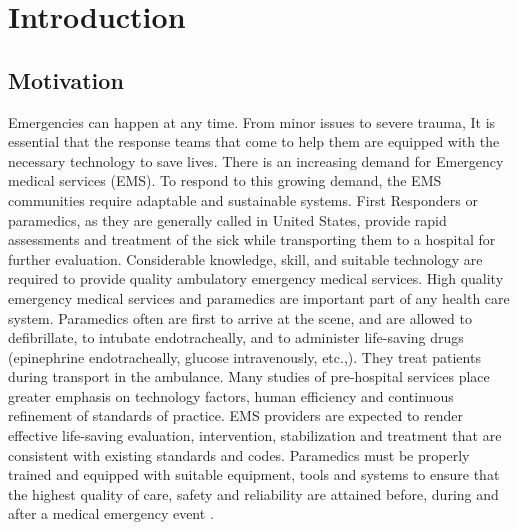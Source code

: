 \chapter{Introduction}
\section{Motivation}
Emergencies can happen at any time. From minor issues to severe trauma, It is essential that the response teams that come to help them are equipped with the necessary technology to save lives. There is an increasing demand for Emergency medical services (EMS). To respond to this growing demand, the EMS communities require adaptable and sustainable systems. First Responders or paramedics, as they are generally called in United States, provide rapid assessments and treatment of the sick while transporting them to a hospital for further evaluation. Considerable knowledge, skill, and suitable technology are required to provide quality ambulatory emergency medical services. High quality emergency medical services and paramedics are important part of any health care system. Paramedics often are first to arrive at the scene, and are allowed to defibrillate, to intubate endotracheally, and to administer life-saving drugs (epinephrine endotracheally, glucose intravenously, etc.,). They treat patients during transport in the ambulance. Many studies of pre-hospital services place greater emphasis on technology factors, human efficiency and continuous refinement of standards of practice. EMS providers are expected to render effective life-saving evaluation, intervention, stabilization and treatment that are consistent with existing standards and codes. Paramedics must be properly trained and equipped with suitable equipment, tools and systems to ensure that the highest quality of care, safety and reliability are attained before, during and after a medical emergency event \cite{EMS, EMS1, EMS2, EMS3}.

